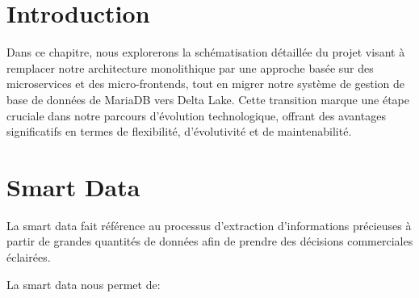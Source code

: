 \section*{Introduction}

Dans ce chapitre, nous explorerons la schématisation détaillée du projet visant à remplacer notre architecture monolithique par une approche basée sur des microservices et des micro-frontends, tout en migrer notre système de gestion de base de données de MariaDB vers Delta Lake. Cette transition marque une étape cruciale dans notre parcours d'évolution technologique, offrant des avantages significatifs en termes de flexibilité, d'évolutivité et de maintenabilité.

\section{Smart Data}

La smart data fait référence au processus d'extraction d'informations précieuses à partir de grandes quantités de données afin de prendre des décisions commerciales éclairées.

La smart data nous permet de:

